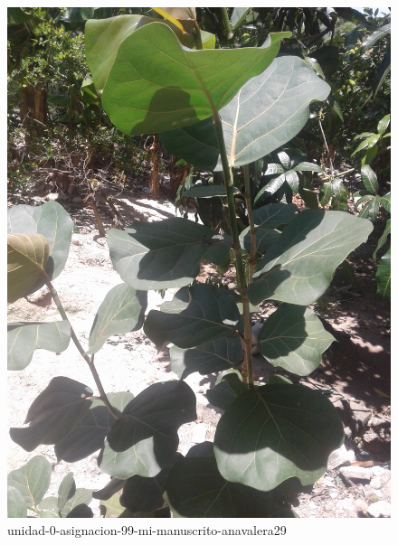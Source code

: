 \documentclass[11pt,]{article}
\begin{document}
\begin{figure}
\centering
\includegraphics{coccoloba_uvifera.jpg}
\caption{unidad-0-asignacion-99-mi-manuscrito-anavalera29\label{coccoloba}}
\end{figure}
\end{document}
